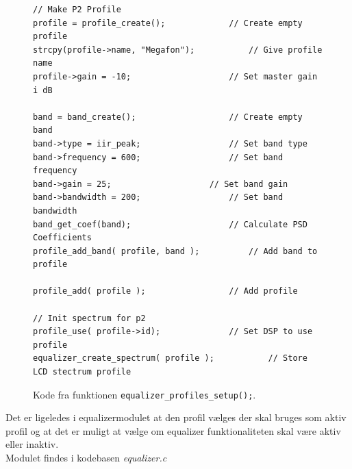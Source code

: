 \begin{figure}[h!]
\centering	
{}
\begin{lstlisting}
// Make P2 Profile
profile = profile_create();				// Create empty profile
strcpy(profile->name, "Megafon");			// Give profile name
profile->gain = -10;					// Set master gain i dB

band = band_create();					// Create empty band
band->type = iir_peak;					// Set band type
band->frequency = 600;					// Set band frequency
band->gain = 25;					// Set band gain
band->bandwidth = 200;					// Set band bandwidth
band_get_coef(band);					// Calculate PSD Coefficients
profile_add_band( profile, band );			// Add band to profile

profile_add( profile );					// Add profile

// Init spectrum for p2
profile_use( profile->id);				// Set DSP to use profile
equalizer_create_spectrum( profile );			// Store LCD stectrum profile
\end{lstlisting}
\caption{Kode fra funktionen \texttt{equalizer\_profiles\_setup();}.}
\label{lst:eq_profil_setup}
\end{figure}

Det er ligeledes i equalizermodulet at den profil vælges der skal bruges som aktiv profil og at det er muligt at vælge om equalizer funktionaliteten skal være aktiv eller inaktiv.\\

Modulet findes i kodebasen \textit{equalizer.c}


  




